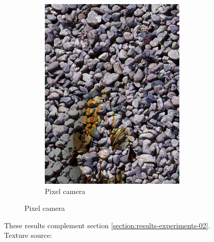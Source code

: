 \begin{figure}[]
\begin{subfigure}{\textwidth}
\begin{subfigure}{0.24\textwidth}
            \includegraphics[width=\textwidth]{images/04-experiment02/human/pebbles/pixel_proj.jpg}
            \caption*{Pixel camera}
        \end{subfigure}
    \end{subfigure}
    \caption{These results complement section \ref{section:results-experiments-02}. Texture source: \citet{Pixar128}}
    \label{fig:ex02-complete-human-pebbles}
\end{figure}

